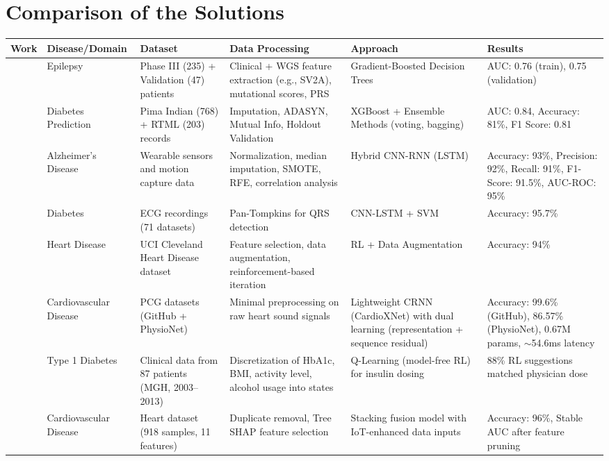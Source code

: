 \section{Comparison of the Solutions}
\begin{table}[htbp]
\begin{adjustwidth}{-2cm}{-2cm}
\centering
\scriptsize
\begin{tabular}{|p{1.5cm}|p{2.5cm}|p{3cm}|p{3.5cm}|p{2.5cm}|p{2.5cm}|}
\hline
\textbf{Work} & \textbf{Disease/Domain} & \textbf{Dataset} & \textbf{Data Processing} & \textbf{Approach} & \textbf{Results} \\
\hline
\cite{article_1} & Epilepsy & Phase III (235) + Validation (47) patients & Clinical + WGS feature extraction (e.g., SV2A), mutational scores, PRS & Gradient-Boosted Decision Trees & AUC: 0.76 (train), 0.75 (validation) \\
\hline
\cite{article_2} & Diabetes Prediction & Pima Indian (768) + RTML (203) records & Imputation, ADASYN, Mutual Info, Holdout Validation & XGBoost + Ensemble Methods (voting, bagging) & AUC: 0.84, Accuracy: 81\%, F1 Score: 0.81 \\
\hline
\cite{article_3} & Alzheimer's Disease & Wearable sensors and motion capture data & Normalization, median imputation, SMOTE, RFE, correlation analysis & Hybrid CNN-RNN (LSTM) & Accuracy: 93\%, Precision: 92\%, Recall: 91\%, F1-Score: 91.5\%, AUC-ROC: 95\% \\
\hline
\cite{article_4} & Diabetes & ECG recordings (71 datasets) & Pan-Tompkins for QRS detection & CNN-LSTM + SVM & Accuracy: 95.7\% \\
\hline
\cite{article_5} & Heart Disease & UCI Cleveland Heart Disease dataset & Feature selection, data augmentation, reinforcement-based iteration & RL + Data Augmentation & Accuracy: 94\% \\
\hline
\cite{article_6} & Cardiovascular Disease & PCG datasets (GitHub + PhysioNet) & Minimal preprocessing on raw heart sound signals & Lightweight CRNN (CardioXNet) with dual learning (representation + sequence residual) & Accuracy: 99.6\% (GitHub), 86.57\% (PhysioNet), 0.67M params, $\sim$54.6ms latency \\
\hline
\cite{article_7} & Type 1 Diabetes & Clinical data from 87 patients (MGH, 2003–2013) & Discretization of HbA1c, BMI, activity level, alcohol usage into states & Q-Learning (model-free RL) for insulin dosing & 88\% RL suggestions matched physician dose \\
\hline
\cite{article_8} & Cardiovascular Disease & Heart dataset (918 samples, 11 features) & Duplicate removal, Tree SHAP feature selection & Stacking fusion model with IoT-enhanced data inputs & Accuracy: 96\%, Stable AUC after feature pruning \\

\end{tabular}
\end{adjustwidth}
\end{table}
